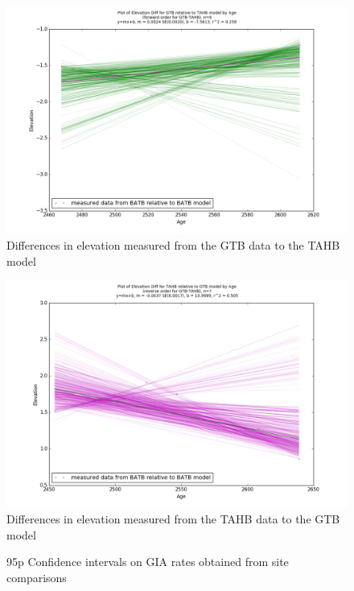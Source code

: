 \begin{figure}[h]
	\includegraphics[width=0.9\linewidth]{data/gias/theGIA_GTB_relative_to_TAHB.png}
	\caption{Differences in elevation measured from the GTB data to the TAHB model}
	\label{fig:gias_GTBxTAHB}
\end{figure}
\newpage


\begin{figure}[h]
	\includegraphics[width=0.9\linewidth]{data/gias/theGIA_TAHB_relative_to_GTB.png}
	\caption{Differences in elevation measured from the TAHB data to the GTB model}
	\label{fig:gias_TAHBxGTB}
\end{figure}
\newpage


\begin{figure}[h]
	\caption{95p Confidence intervals on GIA rates obtained from site comparisons}
	\label{fig:intervalsGIA}
\end{figure}


\newpage

